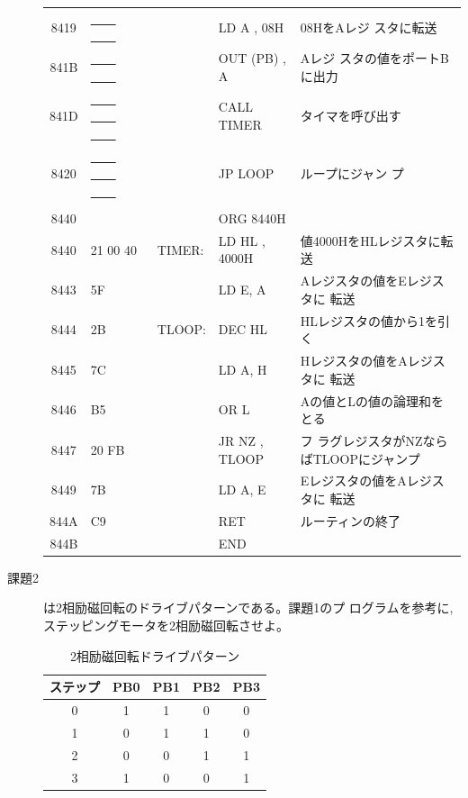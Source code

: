 \begin{description}
\begin{table}
\begin{center}
\begin{tabular}{|c|l|ll|l|}
   8419 &  \underline{~~~~} \underline{~~~~}      &   &   LD A , 08H& 08HをAレジ
                    スタに転送\\
   841B &  \underline{~~~~} \underline{~~~~}     &   &   OUT (PB) , A   & Aレジ
                    スタの値をポートBに出力\\
   841D &  \underline{~~~~} \underline{~~~~} \underline{~~~~}   &   &   CALL
                TIMER& タイマを呼び出す\\
   8420 &  \underline{~~~~} \underline{~~~~} \underline{~~~~}   &   &   JP LOOP& ループにジャン
                    プ\\
        &            &   &&\\
   8440 &            &    &    ORG 8440H&\\
   8440 &  21 00 40   &    TIMER:& LD
                HL , 4000H& 値4000HをHLレジスタに転送\\
   8443 &  5F        &    &    LD E, A&Aレジスタの値をEレジスタに
                    転送\\
   8444 &  2B        &    TLOOP:& DEC HL&HLレジスタの値から1を引く\\
   8445 &  7C        &    &    LD A, H&Hレジスタの値をAレジスタに
                    転送\\
   8446 &  B5        &    &    OR L& Aの値とLの値の論理和をとる\\
   8447 &  20 FB       &    &    JR NZ , TLOOP& フ
                    ラグレジスタがNZならばTLOOPにジャンプ\\
   8449 &  7B        &    &    LD A, E& Eレジスタの値をAレジスタに
                    転送\\
   844A &  C9        &    &    RET&ルーティンの終了\\
   844B &            &    &    END&\\
\hline
\end{tabular}
\end{center}
\end{table}



\item[課題2] は2相励磁回転のドライブパターンである。課題1のプ
           ログラムを参考に, ステッピングモータを2相励磁回転させよ。

\begin{table}
\begin{center}
\caption{2相励磁回転ドライブパターン}
\footnotesize
\begin{tabular}{|c|c|c|c|c|}
\hline
ステップ&PB0& PB1&  PB2&  PB3\\ \hline
       0&  1&   1&    0&    0\\ \hline
       1&  0&   1&    1&    0\\ \hline
       2&  0&   0&    1&    1\\ \hline
       3&  1&   0&    0&    1\\
\hline
\end{tabular}
\end{center}
\label{tab:2sou}
\end{table}



\end{description}
